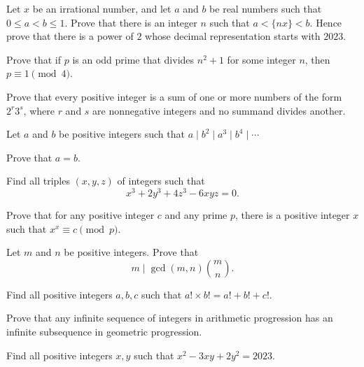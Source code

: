 \begin{problem}{\label{p:i:n:pr:24}}
  Let $x$ be an irrational number, and let $a$ and $b$ be real numbers
    such that $0\le a<b\le 1$. Prove that there is an integer $n$ such that
    $a<\{nx\}<b$. Hence prove that there is a power of $2$ whose decimal
    representation starts with $2023$.
\end{problem}
\begin{result}{\label{r:i:n:pr:2}}
  Prove that if $p$ is an odd prime that divides $n^2+1$ for some integer
    $n$, then $p\equiv 1\pmod 4$.
\end{result}
\begin{problem}{\label{p:i:n:pr:25}}
      Prove that every positive integer is a sum of one or more numbers of
      the form $2^r3^s$, where $r$ and $s$ are nonnegative integers and no
      summand divides another.
\end{problem}
\begin{problem}{\label{p:i:n:pr:26}}
      Let $a$ and $b$ be positive integers such that $a\mid b^2\mid a^3\mid
      b^4\mid\cdots$

      Prove that $a=b$.
\end{problem}
\begin{problem}{\label{p:i:n:pr:28}}
  Find all triples $(x, y, z)$ of integers such that
    \[x^3 + 2y^3 + 4z^3 - 6xyz = 0.\]
\end{problem}
\begin{problem}{\label{p:i:n:pr:29}}
  Prove that for any positive integer $c$ and any prime $p$, there is a
    positive integer $x$ such that $x^x\equiv c\pmod p$.
\end{problem}
\begin{problem}{\label{p:i:n:pr:30}}
      Let $m$ and $n$ be positive integers. Prove that
      \[m\mid\gcd(m,n)\binom mn.\]
\end{problem}
\begin{problem}{\label{p:i:n:pr:31}}
  Find all positive integers $a, b, c$ such that $a! \times b! = a! +
    b! + c!$.
\end{problem}
\begin{problem}{\label{p:i:n:pr:32}}
  Prove that any infinite sequence of integers in arithmetic progression has an
    infinite subsequence in geometric progression.
\end{problem}
\begin{problem}{\label{p:i:n:pr:33}}
  Find all positive integers $x, y$ such that $x^2-3xy+2y^2=2023$.
\end{problem}
